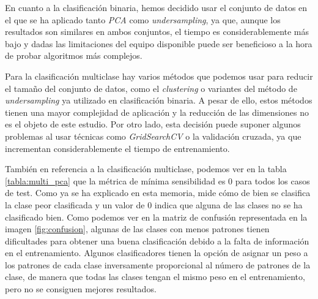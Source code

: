 En cuanto a la clasificación binaria, hemos decidido usar el conjunto de datos en el que se ha aplicado tanto \textit{PCA} como \textit{undersampling}, ya que, aunque los resultados son similares en ambos conjuntos, el tiempo es considerablemente más bajo y dadas las limitaciones del equipo disponible puede ser beneficioso a la hora de probar algoritmos más complejos.

\vspace{1em}

Para la clasificación multiclase hay varios métodos que podemos usar para reducir el tamaño del conjunto de datos, como el \textit{clustering} o variantes del método de \textit{undersampling} ya utilizado en clasificación binaria. A pesar de ello, estos métodos tienen una mayor complejidad de aplicación y la reducción de las dimensiones no es el objeto de este estudio. Por otro lado, esta decisión puede suponer algunos problemas al usar técnicas como \textit{GridSearchCV} o la validación cruzada, ya que incrementan considerablemente el tiempo de entrenamiento.

\vspace{1em}

También en referencia a la clasificación multiclase, podemos ver en la tabla \ref{tabla:multi_pca} que la métrica de mínima sensibilidad es 0 para todos los casos de test. Como ya se ha explicado en esta memoria, mide cómo de bien se clasifica la clase peor clasificada y un valor de 0 indica que alguna de las clases no se ha clasificado bien. Como podemos ver en la matriz de confusión representada en la imagen \ref{fig:confusion}, algunas de las clases con menos patrones tienen dificultades para obtener una buena clasificación debido a la falta de información en el entrenamiento. Algunos clasificadores tienen la opción de asignar un peso a los patrones de cada clase inversamente proporcional al número de patrones de la clase, de manera que todas las clases tengan el mismo peso en el entrenamiento, pero no se consiguen mejores resultados.

